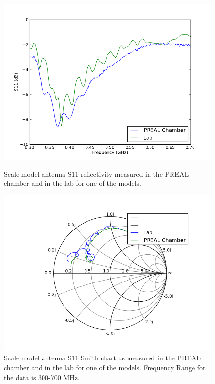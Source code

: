 \begin{figure}[htb]
\centering
\begin{minipage}[b]{0.50\textwidth}
\centering
\includegraphics[width=0.95\linewidth]{SCIHI_system/figures/HIbiscus_S11_model_dB_PREAL.png}
\caption{Scale model antenna S11 reflectivity measured in the PREAL chamber and in the lab for one of the models. }
\label{Fig:HIS11_model_dB}
\end{minipage}%
\begin{minipage}[b]{0.02\textwidth}
\hspace{1cm}
\end{minipage}%
\begin{minipage}[b]{0.46\textwidth}
\centering
\includegraphics[width=0.95\linewidth]{SCIHI_system/figures/HIbiscus_S11_model_Smith_PREAL.png}
\caption{Scale model antenna S11 Smith chart as measured in the PREAL chamber and in the lab for one of the models. Frequency Range for the data is 300-700 MHz.}
\label{Fig:HIS11_model_Smith}
\end{minipage}
\end{figure}

